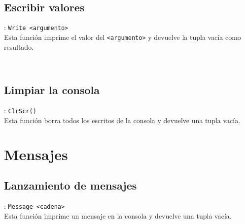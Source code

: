       \begin{fxcode}
         \\
         \\
         \outcode{()}
      \end{fxcode}
      
      \subsection*{Escribir valores}: \texttt{Write <argumento>}\\
      Esta función imprime el valor del \texttt{<argumento>} y devuelve la tupla vacía como resultado.
      
      \begin{fxcode}
         \\
         \outcode{[1, 2]()}
      \end{fxcode}
      
      \subsection*{Limpiar la consola}: \texttt{ClrScr()}\\
      Esta función borra todos los escritos de la consola y devuelve una tupla vacía.
      
      \begin{fxcode}
      \end{fxcode}
      
   \section{Mensajes}
      
      \subsection*{Lanzamiento de mensajes}: \texttt{Message <cadena>}\\
      Esta función imprime un mensaje en la consola y devuelve una tupla vacía.
      
      \begin{fxcode}
         \\
         \\
         \outcode{()}
      \end{fxcode}
      
